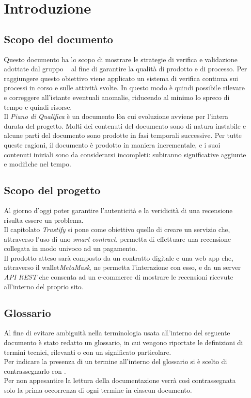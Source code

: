 \section{Introduzione}


\subsection{Scopo del documento}
Questo documento ha lo scopo di mostrare le strategie di verifica e validazione adottate dal gruppo \groupName ~ al fine di garantire la qualità di prodotto e di processo. Per raggiungere questo obiettivo viene applicato un sistema di verifica continua sui processi in corso e sulle attività svolte. In questo modo è quindi possibile rilevare e correggere all’istante eventuali anomalie, riducendo al minimo lo spreco di tempo e quindi risorse.\\
Il \textit{Piano di Qualifica} è un documento lòa cui evoluzione avviene per l’intera durata del progetto. Molti dei contenuti del documento sono di natura instabile e alcune parti del documento sono prodotte in fasi temporali successive. Per tutte queste ragioni, il documento è prodotto in maniera incrementale, e i suoi contenuti iniziali sono da considerarsi incompleti: subiranno significative aggiunte e modifiche nel tempo.




\subsection{Scopo del progetto}

Al giorno d'oggi poter garantire l'autenticità e la veridicità di una
recensione\glo\: risulta essere un problema. \\ Il capitolato \textit{Trustify} si
pone come obiettivo quello di creare un servizio che, attraverso l'uso di uno
\textit{smart contract}\glo\:, permetta di effettuare una recensione collegata in
modo univoco ad un pagamento. \\ Il prodotto atteso sarà composto da un
contratto digitale e una web app che, attraverso il wallet\glo \textit{MetaMask}\glo\:, ne
permetta l'interazione con esso, e da un server \textit{API REST}\glo\: che consenta ad un
e-commerce\glo\: di mostrare le recensioni ricevute all'interno del proprio sito.

\subsection{Glossario}
Al fine di evitare ambiguità nella terminologia usata all'interno del seguente
documento è stato redatto un glossario, in cui vengono riportate le definizioni
di termini tecnici, rilevanti o con un significato particolare. \\ Per indicare
la presenza di un termine all'interno del glossario si è scelto di
contrassegnarlo con \glo.\\ Per non appesantire la lettura della documentazione
verrà così contrassegnata solo la prima occorrenza di ogni termine in ciascun
documento.

